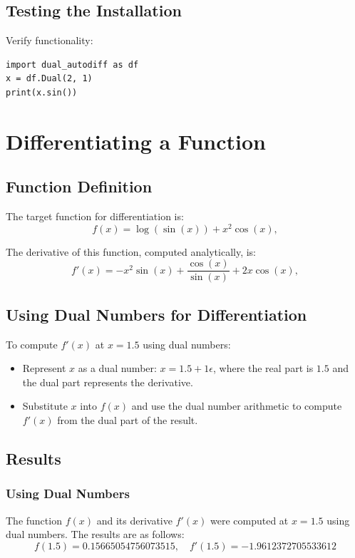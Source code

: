 \documentclass[a4paper,12pt]{article}
\begin{document}
\subsection{Testing the Installation}
Verify functionality:
\begin{verbatim}
import dual_autodiff as df
x = df.Dual(2, 1)
print(x.sin())
\end{verbatim}



\section{Differentiating a Function}

\subsection{Function Definition}
The target function for differentiation is:
\begin{equation}
    f(x) = \log(\sin(x)) + x^2 \cos(x),
    \label{eq:function_definition}
    \end{equation}
    
The derivative of this function, computed analytically, is:
\begin{equation}
    f'(x) = -x^2 \sin(x) + \frac{\cos(x)}{\sin(x)} + 2x \cos(x),
    \label{eq:function_derivative}
    \end{equation}
    

\subsection{Using Dual Numbers for Differentiation}
To compute \(f'(x)\) at \(x = 1.5\) using dual numbers:
\begin{itemize}
    \item Represent \(x\) as a dual number: \(x = 1.5 + 1\epsilon\), where the real part is \(1.5\) and the dual part represents the derivative.
    \item Substitute \(x\) into \(f(x)\) and use the dual number arithmetic to compute \(f'(x)\) from the dual part of the result.
\end{itemize}

\subsection{Results}

\subsubsection{Using Dual Numbers}
The function \(f(x)\) and its derivative \(f'(x)\) were computed at \(x = 1.5\) using dual numbers. The results are as follows:
\[
f(1.5) = 0.15665054756073515, \quad f'(1.5) = -1.9612372705533612
\]
\end{document}
